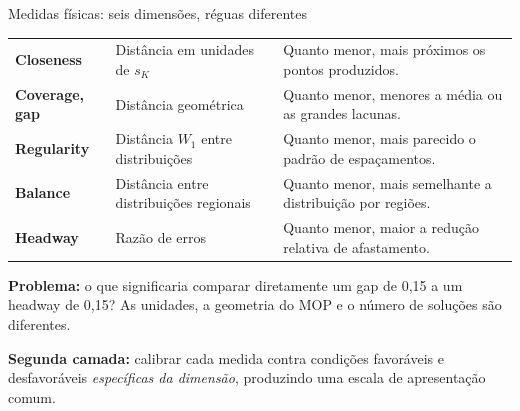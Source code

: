 \begin{frame}{Medidas físicas: seis dimensões, réguas diferentes}
\renewcommand{\arraystretch}{1.10}
\begin{tabularx}{\linewidth}{@{}>{\bfseries}p{.22\linewidth}p{.29\linewidth}X@{}}
Closeness & Distância em unidades de $s_K$ & Quanto menor, mais próximos os pontos produzidos.\\
Coverage, gap & Distância geométrica & Quanto menor, menores a média ou as grandes lacunas.\\
Regularity & Distância $W_1$ entre distribuições & Quanto menor, mais parecido o padrão de espaçamentos.\\
Balance & Distância entre distribuições regionais & Quanto menor, mais semelhante a distribuição por regiões.\\
Headway & Razão de erros & Quanto menor, maior a redução relativa de afastamento.\\
\end{tabularx}
\vspace{.08cm}
\textbf{Problema:} o que significaria comparar diretamente um gap de 0,15 a um headway de 0,15? As unidades, a geometria do MOP e o número de soluções são diferentes.
\par\smallskip
\textbf{Segunda camada:} calibrar cada medida contra condições favoráveis e desfavoráveis \emph{específicas da dimensão}, produzindo uma escala de apresentação comum.
\end{frame}

